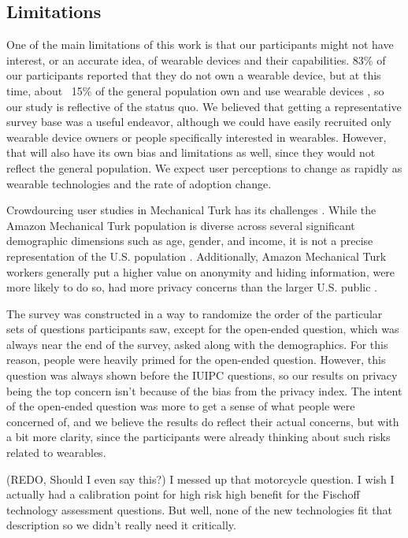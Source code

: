 \documentclass{acm_proc_article-sp}
\begin{document}
\subsection{Limitations}
One of the main limitations of this work is that our participants might not have interest, or an accurate idea, of wearable devices and their capabilities. 83\% of our participants reported that they do not own a wearable device, but at this time, about ~15\% of the general population own and use wearable devices \cite{Nilsen}\cite{WearableStatNews}, so our study is reflective of the status quo. We believed that getting a representative survey base was a useful endeavor, although we could have easily recruited only wearable device owners or people specifically interested in wearables. However, that will also have its own bias and limitations as well, since they would not reflect the general population. We expect user perceptions to change as rapidly as wearable technologies and the rate of adoption change. 

Crowdourcing user studies in Mechanical Turk has its challenges \cite{kittur2008crowdsourcing}. While the Amazon Mechanical Turk population is diverse across several significant demographic dimensions such as age, gender, and income, it is not a precise representation of the U.S. population \cite{ross2010crowdworkers}\cite{kelley2010conducting}. Additionally, Amazon Mechanical Turk workers generally put a higher value on anonymity and hiding information, were more likely to do so, had more privacy concerns than the larger U.S. public \cite{kang2014privacy}. 

The survey was constructed in a way to randomize the order of the particular sets of questions participants saw, except for the open-ended question, which was always near the end of the survey, asked along with the demographics. For this reason, people were heavily primed for the open-ended question. However, this question was always shown before the IUIPC questions, so our results on privacy being the top concern isn't because of the bias from the privacy index. The intent of the open-ended question  was more to get a sense of what people were concerned of, and we believe the results do reflect their actual concerns, but with a bit more clarity, since the participants were already thinking about such risks related to wearables. 

(REDO, Should I even say this?) I messed up that motorcycle question. I wish I actually had a calibration point for high risk high benefit for the Fischoff technology assessment questions. But well, none of the new technologies fit that description so we didn't really need it critically. 
\end{document}
